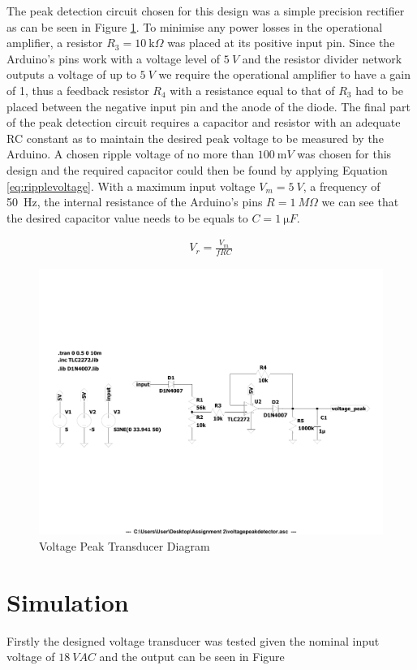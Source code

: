 The peak detection circuit chosen for this design was a simple precision rectifier as can be seen in Figure \ref{fig:voltagepeakdetector.pdf}. To minimise any power losses in the operational amplifier, a resistor $R_3=\SI{10}{\kilo \Omega}$ was placed at its positive input pin. Since the Arduino's pins work with a voltage level of $\SI{5}{V}$ and the resistor divider network outputs a voltage of up to $\SI{5}{V}$ we require the operational amplifier to have a gain of 1, thus a feedback resistor $R_4$ with a resistance equal to that of $R_3$ had to be placed between the negative input pin and the anode of the diode.
The final part of the peak detection circuit requires a capacitor and resistor with an adequate RC constant as to maintain the desired peak voltage to be measured by the Arduino. A chosen ripple voltage of no more than $\SI{100}{\milli V}$ was chosen for this design and the required capacitor could then be found by applying Equation \ref{eq:ripplevoltage}. With a maximum input voltage $V_{m}=\SI{5}{V}$, a frequency of \SI{50}{Hz}, the internal resistance of the Arduino's pins $R=\SI{1}{M\Omega}$ we can see that the desired capacitor value needs to be equals to $C=\SI{1}{\micro F}$. 

\begin{align}
  V_{r} = \frac{V_{m}}{fRC} 
   \label{eq:ripplevoltage}
\end{align}

\begin{figure}[h!]
    \centering
    \includegraphics[width = 0.65\linewidth]{Figures/voltagepeakdetector.pdf}
        \caption{Voltage Peak Transducer Diagram}
    \label{fig:voltagepeakdetector.pdf}
\end{figure}


\section{Simulation} \label{sec:simulation_voltage_peak_transducer}
Firstly the designed voltage transducer was tested given the nominal input voltage of $\SI{18}{VAC}$ and the output can be seen in Figure 

